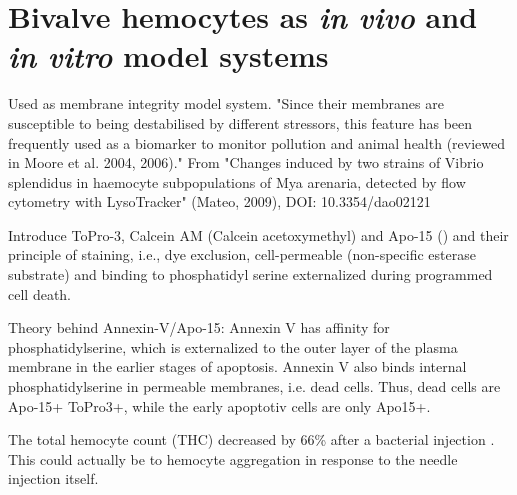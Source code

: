 \section{Bivalve hemocytes as \emph{in vivo} and \emph{in vitro} model systems}
Used as membrane integrity model system. "Since their membranes are susceptible to being destabilised by different stressors, this feature has been frequently used as a biomarker to monitor pollution and animal health (reviewed in Moore et al. 2004, 2006)." From "Changes induced by two strains of Vibrio splendidus in haemocyte subpopulations of Mya arenaria, detected by flow cytometry with LysoTracker" (Mateo, 2009), DOI: 10.3354/dao02121 

Introduce ToPro-3, Calcein AM (Calcein acetoxymethyl) and Apo-15 (\cite{Barth2020}) and their principle of staining, i.e., dye exclusion, cell-permeable (non-specific esterase substrate) and binding to phosphatidyl serine externalized during programmed cell death.

Theory behind Annexin-V/Apo-15: Annexin V
has affinity for phosphatidylserine, which is externalized to the
outer layer of the plasma membrane in the earlier stages of apoptosis. Annexin V also binds internal phosphatidylserine in permeable membranes, i.e. dead cells. Thus, dead cells are Apo-15+ ToPro3+, while the early apoptotiv cells are only Apo15+.

The total hemocyte count (THC) decreased by 66\% after a bacterial injection \cite{Parisi2008}. This could actually be to hemocyte aggregation in response to the needle injection itself.
